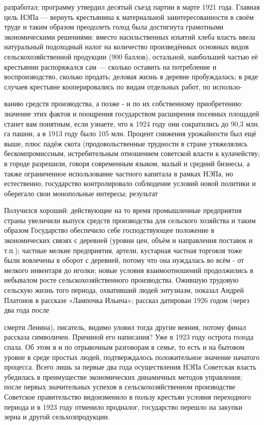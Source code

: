\label{088-1}
разработал; программу утвердил десятый съезд партии в марте 1921 года. Главная цель НЭПа — вернуть крестьянина к материальной заинтересованности в своём труде и таким образом преодолеть голод была достигнута грамотными экономическими решениями: вместо насильственных изъятий хлеба власть ввела натуральный подоходный налог на количество произведённых основных видов сельскохозяйственной продукции (900 баллов), остальной, наибольшей частью её крестьянин распоряжался сам — сколько оставить на потребление и воспроизводство, сколько продать; деловая жизнь в деревне пробуждалась; в ряде случаев крестьяне кооперировались по видам отдельных работ, по использо-

\label{089-1}
ванию средств производства, а позже - и по их собственному приобретению: значение этих фактов и поощрения государством расширения посевных площадей станет вам понятным, если узнаете, что к 1924 году они сократились до 90,3 млн. га пашни, а в 1913 году было 105 млн. Процент снижения урожайности был ещё выше, плюс падёж скота (продовольственные трудности в стране утяжелялись бескомпромиссным, истребительным отношением советской власти к кулачейству; в городе разрешили, говоря современным языком, малый и средний бизнесы, а также ограниченное использование частного капитала в рамках НЭПа, но естественно, государство контролировало соблюдение условий новой политики и оберегало свои монопольные интересы; результат

\label{090-1}
Получился хороший: действующие на то время промышленные предприятия страны увеличили выпуск средств производства для сельского хозяйства и таким образом Государство обеспечило себе господствующее положение в экономических связях с деревней (уровни цен, объём и направления поставок и т.п.); частные мелкие предприятия, артели, кустарная частная торговля тоже были вовлечены в оборот с деревней, потому что она нуждалась во всём - от мелкого инвентаря до иголки; новые условия взаимоотношений продолжились в небывалом росте сельскохозяйственного производства. Ожившую трудовую сельскую жизнь того периода, охвативший людей энтузиазм, показал Андрей Платонов в рассказе «Лампочка Ильича»; рассказ датирован 1926 годом (через два года после

\label{091-1}
смерти Ленина), писатель, видимо уловил тогда другие веяния, потому финал рассказа символичен. Причиной его написания? Уже в 1923 году острота голода спала. Об этом я и по отрывочным разговорам в семье, то есть и на бытовом уровне в среде простых людей, подтверждалось положительное значение начатого процесса. Всего лишь за первые два года осуществления НЭПа Советская власть убедилась в преимуществе экономических динамичных методов управления; после первых значительных успехов в сельскохозяйственном производстве Советское правительство видоизменило в пользу крестьян условия переходного периода и в 1923 году отменило продналог, государство перешло на закупки зерна и другой сельхозпродукции.

